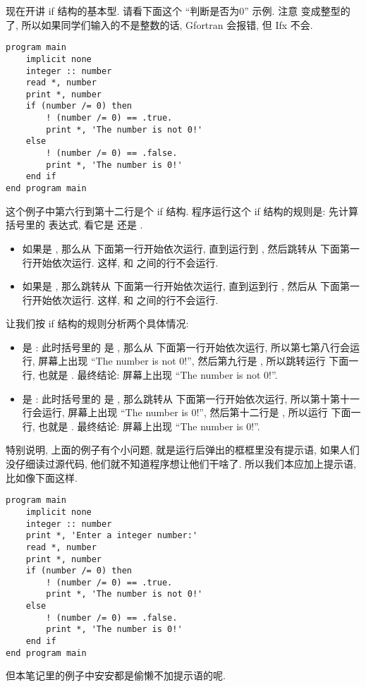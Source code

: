 现在开讲 if 结构的基本型. 请看下面这个 ``判断是否为0'' 示例. 注意  变成整型的了, 所以如果同学们输入的不是整数的话, Gfortran 会报错, 但 Ifx 不会.\label{whether_zero}
\begin{lstlisting}
program main
    implicit none
    integer :: number
    read *, number
    print *, number
    if (number /= 0) then
        ! (number /= 0) == .true.
        print *, 'The number is not 0!'
    else
        ! (number /= 0) == .false.
        print *, 'The number is 0!'
    end if
end program main
\end{lstlisting}
这个例子中第六行到第十二行是个 if 结构. 程序运行这个 if 结构的规则是: 先计算括号里的 表达式, 看它是  还是 .
\begin{itemize}
    \item 如果是 , 那么从  下面第一行开始依次运行, 直到运行到  , 然后跳转从  下面第一行开始依次运行. 这样,  和  之间的行不会运行.
    \item 如果是 , 那么跳转从  下面第一行开始依次运行, 直到运到行  , 然后从  下面第一行开始依次运行. 这样,  和  之间的行不会运行.
\end{itemize}
让我们按 if 结构的规则分析两个具体情况:
\begin{itemize}
    \item {} 是 : 此时括号里的  是 , 那么从  下面第一行开始依次运行, 所以第七第八行会运行, 屏幕上出现 ``The number is not 0!'', 然后第九行是 , 所以跳转运行  下面一行, 也就是 . 最终结论: 屏幕上出现 ``The number is not 0!''.
    \item {} 是 : 此时括号里的  是 , 那么跳转从  下面第一行开始依次运行, 所以第十第十一行会运行, 屏幕上出现 ``The number is 0!'', 然后第十二行是 , 所以运行  下面一行, 也就是 . 最终结论: 屏幕上出现 ``The number is 0!''.
\end{itemize}

特别说明, 上面的例子有个小问题, 就是运行后弹出的框框里没有提示语, 如果人们没仔细读过源代码, 他们就不知道程序想让他们干啥了. 所以我们本应加上提示语, 比如像下面这样.
\begin{lstlisting}
program main
    implicit none
    integer :: number
    print *, 'Enter a integer number:'
    read *, number
    print *, number
    if (number /= 0) then
        ! (number /= 0) == .true.
        print *, 'The number is not 0!'
    else
        ! (number /= 0) == .false.
        print *, 'The number is 0!'
    end if
end program main
\end{lstlisting}
但本笔记里的例子中安安都是偷懒不加提示语的呢.

